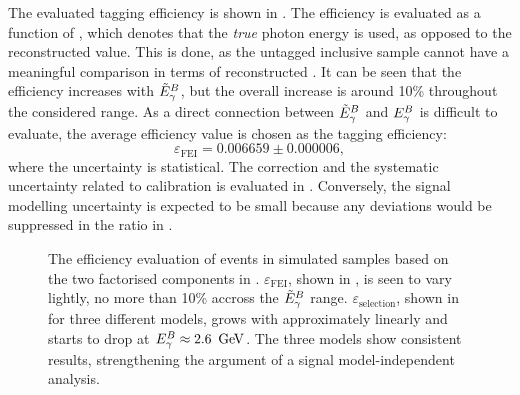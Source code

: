 The evaluated tagging efficiency is shown in .
The efficiency is evaluated as a function of \EtildeB, which denotes that the \textit{true} photon energy is used, 
as opposed to the reconstructed value.
This is done, as the untagged inclusive sample cannot have a meaningful comparison in terms of reconstructed \EB.
It can be seen that the efficiency increases with ${\tilde{E}_{\gamma}^B}$, but the overall increase is around 10\% throughout the considered range.
As a direct connection between ${\tilde{E}_{\gamma}^B}$ and ${E^B_{\gamma}}$ is difficult to evaluate, the average efficiency value is chosen as the tagging efficiency:
\begin{equation}\label{eq:avg_efficiency_fei}
    \varepsilon_{\mathrm{FEI}} = 0.006659 \pm 0.000006,
\end{equation}
where the uncertainty is statistical.
The correction and the systematic uncertainty related to \FEI calibration is evaluated in .
Conversely, the signal modelling uncertainty is expected to be small because any deviations would be suppressed in the ratio in .
\begin{figure}[htbp!]
    \centering
    \caption{\label{fig:epsilon} The efficiency evaluation of \BtoXsgamma events in simulated samples based on the two factorised components in
    .
    $\varepsilon_{\mathrm{FEI}}$, shown in , is seen to vary lightly, no more than 10\% accross the ${\tilde{E}_{\gamma}^B}$ range.
    $\varepsilon_{\mathrm{selection}}$, shown in  for three different models,
    grows with \EB approximately linearly and starts to drop at ${E^B_{\gamma}}\approx2.6~\mathrm{\,Ge\kern -0.1em V}$.
    The three models show consistent results, strengthening the argument of a signal model-independent analysis.
    }
\end{figure}

